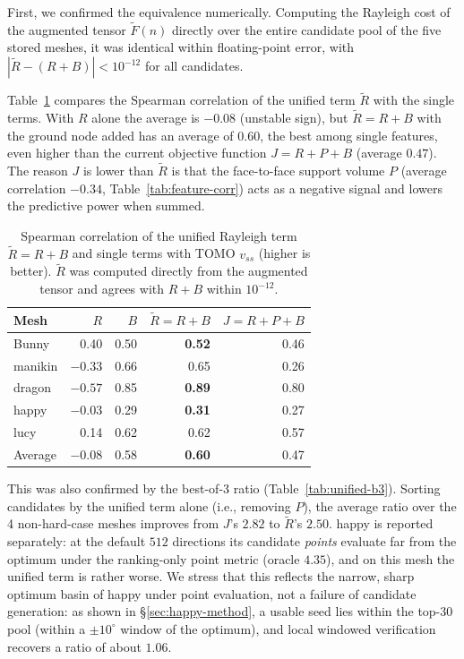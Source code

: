 \documentclass[11pt,a4paper]{article}
\begin{document}
First, we confirmed the equivalence numerically.
Computing the Rayleigh cost of the augmented tensor $\tilde F(n)$ directly over the entire candidate pool of the five stored meshes,
it was identical within floating-point error, with $|\tilde R-(R+B)|<10^{-12}$ for all candidates.

Table~\ref{tab:unified-corr} compares the Spearman correlation of the unified term $\tilde R$ with the single terms.
With $R$ alone the average is $-0.08$ (unstable sign), but
$\tilde R=R+B$ with the ground node added has an average of $0.60$, the best among single features,
even higher than the current objective function $J=R+P+B$ (average $0.47$).
The reason $J$ is lower than $\tilde R$ is that the face-to-face support volume $P$ (average correlation $-0.34$, Table~\ref{tab:feature-corr})
acts as a negative signal and lowers the predictive power when summed.

\begin{table}[H]
\centering
\caption{Spearman correlation of the unified Rayleigh term $\tilde R=R+B$ and single terms with TOMO $v_{ss}$ (higher is better).
$\tilde R$ was computed directly from the augmented tensor and agrees with $R+B$ within $10^{-12}$.}
\label{tab:unified-corr}
\begin{tabular}{lrrrr}
\toprule
Mesh & $R$ & $B$ & $\tilde R=R{+}B$ & $J=R{+}P{+}B$\\
\midrule
Bunny   & 0.40 & 0.50 & \textbf{0.52} & 0.46\\
manikin & $-0.33$ & 0.66 & 0.65 & 0.26\\
dragon  & $-0.57$ & 0.85 & \textbf{0.89} & 0.80\\
happy   & $-0.03$ & 0.29 & \textbf{0.31} & 0.27\\
lucy    & 0.14 & 0.62 & 0.62 & 0.57\\
\midrule
Average    & $-0.08$ & 0.58 & \textbf{0.60} & 0.47\\
\bottomrule
\end{tabular}
\end{table}

This was also confirmed by the best-of-3 ratio (Table~\ref{tab:unified-b3}).
Sorting candidates by the unified term alone (i.e., removing $P$),
the average ratio over the 4 non-hard-case meshes improves from $J$'s $2.82$ to $\tilde R$'s $2.50$.
happy is reported separately: at the default $512$ directions its candidate \emph{points} evaluate far from the
optimum under the ranking-only point metric (oracle $4.35$), and on this mesh the unified term is rather worse.
We stress that this reflects the narrow, sharp optimum basin of happy under point evaluation, not a failure of
candidate generation: as shown in \S\ref{sec:happy-method}, a usable seed lies within the top-$30$ pool (within a
$\pm 10^\circ$ window of the optimum), and local windowed verification recovers a ratio of about $1.06$.
\end{document}
